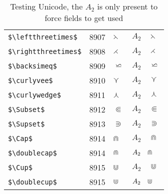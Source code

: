 \documentclass{article}
\begin{document}
\begin{table}
\begin{center}
\begin{tabular}{llll}
 \verb#$\leftthreetimes$#   & 8907    & $\leftthreetimes$   & $A_2\quad \leftthreetimes$\\
 \verb#$\rightthreetimes$#  & 8908    & $\rightthreetimes$  & $A_2\quad \rightthreetimes$\\
 \verb#$\backsimeq$#        & 8909    & $\backsimeq$        & $A_2\quad \backsimeq$\\
 \verb#$\curlyvee$#         & 8910    & $\curlyvee$         & $A_2\quad \curlyvee$\\
 \verb#$\curlywedge$#       & 8911    & $\curlywedge$       & $A_2\quad \curlywedge$\\
 \verb#$\Subset$#           & 8912    & $\Subset$           & $A_2\quad \Subset$\\
 \verb#$\Supset$#           & 8913    & $\Supset$           & $A_2\quad \Supset$\\
 \verb#$\Cap$#              & 8914    & $\Cap$              & $A_2\quad \Cap$\\
 \verb#$\doublecap$#        & 8914    & $\doublecap$        & $A_2\quad \doublecap$\\
 \verb#$\Cup$#              & 8915    & $\Cup$              & $A_2\quad \Cup$\\
 \verb#$\doublecup$#        & 8915    & $\doublecup$        & $A_2\quad \doublecup$\\
\end{tabular}
\end{center}
\caption{Testing Unicode, the $A_2$ is only present to force fields to get used}
\end{table}
\clearpage
\end{document}
